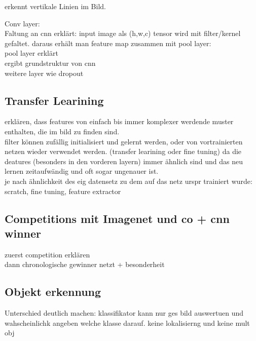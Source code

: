 erkennt vertikale Linien im Bild. 




Conv layer:\\
Faltung an cnn erklärt: input image als (h,w,c) tensor wird mit filter/kernel gefaltet. daraus erhält man feature map
zusammen mit pool layer:\\
pool layer erklärt\\

ergibt grundstruktur von cnn\\

weitere layer wie dropout\\

\subsection{Transfer Learining}

erklären, dass features von einfach bis immer komplexer werdende muster enthalten, die im bild zu finden sind.
\\
filter können zufällig initialisiert und gelernt werden, oder von vortrainierten netzen wieder verwendet
werden. (transfer learining oder fine tuning) da die deatures (besonders in den vorderen layern) immer ähnlich sind und das
neu lernen zeitaufwändig und oft sogar ungenauer ist.
\\
je nach ähnlichkeit des eig datensetz zu dem auf das netz urspr trainiert wurde:\\
scratch, fine tuning, feature extractor


\subsection{Competitions mit Imagenet und co + cnn winner}\label{subsec:comp}

zuerst competition erklären \\
dann chronologische gewinner netzt + besonderheit\\




\subsection{Objekt erkennung}\label{sec:objdet}


Unterschied deutlich machen: klassifikator kann nur ges bild auswertuen und wahscheinlichk angeben welche 
klasse darauf. keine lokalisierng und keine mult obj\\

